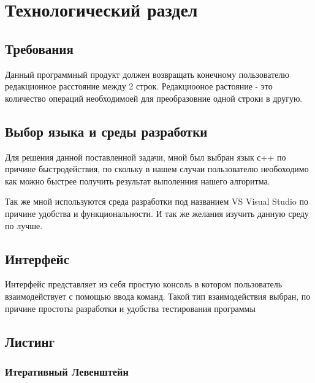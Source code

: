 \documentclass[a4paper, 14pt]{article}
\begin{document}
	\newpage
	\section{Технологический раздел}
	
	\subsection{Требования}
	
	Данный программный продукт должен возвращать конечному пользователю редакционное расстояние между 2 строк. Редакциооное растояние - это количество операций необходимоей для преобразовние одной строки в другую.

	
	\subsection{Выбор языка и среды разработки}
	
	Для решения данной поставленной задачи, мной был выбран язык с++ по причине быстродействия, по скольку в нашем случаи пользователю необоходимо как можно быстрее получить результат выполенния нашего алгоритма.
	
	Так же мной используются среда разработки под названием VS Visual Studio по причине удобства и функциональности. И так же желания изучить данную среду по лучше.
	
	\subsection{Интерфейс}
	
	Интерфейс представляет из себя простую консоль в котором пользователь взаимодействует с помощью ввода команд. Такой тип взаимодействия выбран, по причине простоты разработки и удобства тестирования программы
	
	\subsection{Листинг}
	
	\subsubsection{Итеративный Левенштейн}
	
\end{document}
